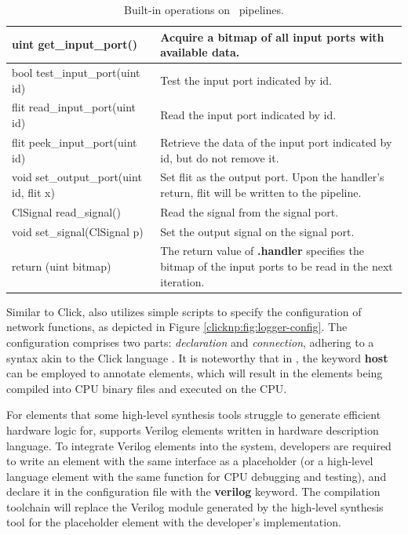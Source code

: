 \begin{table}
	\centering
	\caption{Built-in operations on \name\ pipelines.}
	\label{clicknp:tab:built-in}
	\small
	\begin{tabular}{p{}|p{}}
		\toprule
		uint get\_input\_port() & Acquire a bitmap of all input ports with available data. \\
		\midrule
		bool test\_input\_port(uint id) & Test the input port indicated by id. \\
		\midrule
		flit read\_input\_port(uint id) & Read the input port indicated by id. \\
		\midrule
		flit peek\_input\_port(uint id) & Retrieve the data of the input port indicated by id, but do not remove it. \\
		\midrule
		void set\_output\_port(uint id, flit x) & Set flit as the output port. Upon the handler's return, flit will be written to the pipeline.\\
		\midrule
		ClSignal read\_signal() & Read the signal from the signal port.\\
		\midrule
		void set\_signal(ClSignal p) & Set the output signal on the signal port.\\
		\midrule
		return (uint bitmap) & The return value of \textbf{.handler} specifies the bitmap of the input ports to be read in the next iteration. \\
		\bottomrule
	\end{tabular}
\end{table}

Similar to Click, \name also utilizes simple scripts to specify the configuration of network functions, as depicted in Figure \ref{clicknp:fig:logger-config}. The configuration comprises two parts: \textit {declaration} and \textit {connection}, adhering to a syntax akin to the Click language \cite {kohler2000click}.
It is noteworthy that in \name, the keyword \textbf {host} can be employed to annotate elements, which will result in the elements being compiled into CPU binary files and executed on the CPU.

For elements that some high-level synthesis tools struggle to generate efficient hardware logic for, \name supports Verilog elements written in hardware description language. To integrate Verilog elements into the system, developers are required to write an element with the same interface as a placeholder (or a high-level language element with the same function for CPU debugging and testing), and declare it in the \name configuration file with the \textbf{verilog} keyword. The compilation toolchain will replace the Verilog module generated by the high-level synthesis tool for the placeholder element with the developer's implementation.

